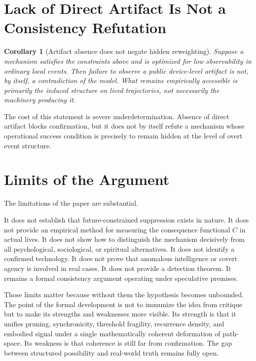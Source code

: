 \documentclass[12pt]{article}
\newtheorem{corollary}{Corollary}
\begin{document}
\section{Lack of Direct Artifact Is Not a Consistency Refutation}

\begin{corollary}[Artifact absence does not negate hidden reweighting]
Suppose a mechanism satisfies the constraints above and is optimized for low observability in ordinary local events. Then failure to observe a public device-level artifact is not, by itself, a contradiction of the model. What remains empirically accessible is primarily the induced structure on lived trajectories, not necessarily the machinery producing it.
\end{corollary}

The cost of this statement is severe underdetermination. Absence of direct artifact blocks confirmation, but it does not by itself refute a mechanism whose operational success condition is precisely to remain hidden at the level of overt event structure.

\section{Limits of the Argument}

The limitations of the paper are substantial.

It does not establish that future-constrained suppression exists in nature. It does not provide an empirical method for measuring the consequence functional $C$ in actual lives. It does not show how to distinguish the mechanism decisively from all psychological, sociological, or spiritual alternatives. It does not identify a confirmed technology. It does not prove that anomalous intelligence or covert agency is involved in real cases. It does not provide a detection theorem. It remains a formal consistency argument operating under speculative premises.

Those limits matter because without them the hypothesis becomes unbounded. The point of the formal development is not to immunize the idea from critique but to make its strengths and weaknesses more visible. Its strength is that it unifies pruning, synchronicity, threshold fragility, recurrence density, and embodied signal under a single mathematically coherent deformation of path-space. Its weakness is that coherence is still far from confirmation. The gap between structured possibility and real-world truth remains fully open.
\end{document}
